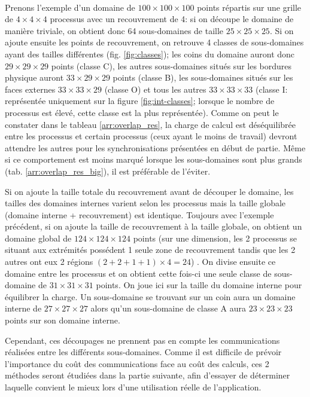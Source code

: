 \paragraph{}Prenons l'exemple d'un domaine de $100\times100\times100$ points répartis sur une grille de $4\times4\times4$ processus avec un recouvrement de 4: si on découpe le domaine de manière triviale, on obtient donc 64 sous-domaines de taille $25\times25\times25$. Si on ajoute ensuite les points de recouvrement, on retrouve 4 classes de sous-domaines ayant des tailles différentes (fig. \ref{fig:classes}); les coins du domaine auront donc $29\times29\times29$ points (classe C), les autres sous-domaines situés sur les bordures physique auront $33\times29\times29$ points (classe B), les sous-domaines situés sur les faces externes $33\times33\times29$ (classe O) et tous les autres $33\times33\times33$ (classe I: représentée uniquement sur la figure \ref{fig:int-classes}; lorsque le nombre de processus est élevé, cette classe est la plus représentée). Comme on peut le constater dans le tableau \ref{arr:overlap_res}, la charge de calcul est déséquilibrée entre les processus et certain processus (ceux ayant le moins de travail) devront attendre les autres pour les synchronisations présentées en début de partie. Même si ce comportement est moins marqué lorsque les sous-domaines sont plus grands (tab. \ref{arr:overlap_res_big}), il est préférable de l'éviter.
  
Si on ajoute la taille totale du recouvrement avant de découper le domaine, les tailles des domaines internes varient selon les processus mais la taille globale (domaine interne + recouvrement) est identique. Toujours avec l'exemple précédent, si on ajoute la taille de recouvrement à la taille globale, on obtient un domaine global de $124\times124\times124$ points (sur une dimension, les 2 processus se situant aux extrémités possédent 1 seule zone de recouvrement tandis que les 2 autres ont eux 2 régions $(2+2+1+1)\times4=24$) . On divise ensuite ce domaine entre les processus et on obtient cette fois-ci une seule classe de sous-domaine de $31\times31\times31$ points. On joue ici sur la taille du domaine interne pour équilibrer la charge. Un sous-domaine se trouvant sur un coin aura un domaine interne de $27\times27\times27$ alors qu'un sous-domaine de classe A aura $23\times23\times23$ points sur son domaine interne.

Cependant, ces découpages ne prennent pas en compte les communications réalisées entre les différents sous-domaines. Comme il est difficile de prévoir l'importance du coût des communications face au coût des calculs, ces 2 méthodes seront étudiées dans la partie suivante, afin d'essayer de déterminer laquelle convient le mieux lors d'une utilisation réelle de l'application.


